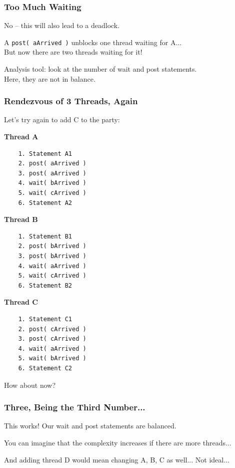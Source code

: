 \begin{frame}
\frametitle{Too Much Waiting}

No -- this will also lead to a deadlock. 

A \texttt{post( aArrived )} unblocks one thread waiting for A...\\
\quad But now there are two threads waiting for it!


Analysis tool: look at the number of wait and post statements.\\
\quad Here, they are not in balance.

\end{frame}

\begin{frame}[fragile]
	\frametitle{Rendezvous of 3 Threads, Again}

	Let's try again to add C to the party:

	\begin{multicols}{3}
		\textbf{Thread A}
		\begin{verbatim}
	1. Statement A1
	2. post( aArrived )
	3. post( aArrived )
	4. wait( bArrived )
	5. wait( cArrived )
	6. Statement A2
  \end{verbatim}
		\columnbreak
		\textbf{Thread B}
		\begin{verbatim}
	1. Statement B1
	2. post( bArrived )
	3. post( bArrived )
	4. wait( aArrived )
	5. wait( cArrived )
	6. Statement B2
  \end{verbatim}
  		\columnbreak
		\textbf{Thread C}
		\begin{verbatim}
	1. Statement C1
	2. post( cArrived )
	3. post( cArrived )
	4. wait( aArrived )
	5. wait( bArrived )
	6. Statement C2
  \end{verbatim}
	\end{multicols}
	\vspace{-2em}

How about now?

\end{frame}


\begin{frame}
\frametitle{Three, Being the Third Number...}

This works! Our wait and post statements are balanced.

You can imagine that the complexity increases if there are more threads... 

And adding thread D would mean changing A, B, C as well... Not ideal...

\end{frame}


